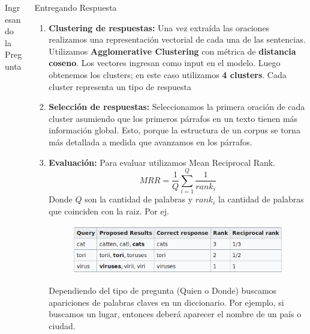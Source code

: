 \documentclass[final]{beamer}
\newlength{\onecolwid}
\newlength{\twocolwid}
\begin{document}
\begin{frame}[t]
\begin{columns}[t]
\begin{column}{\twocolwid}
\begin{columns}[t,totalwidth=\twocolwid]
\begin{column}{\onecolwid}
\begin{block}{Ingresando la Pregunta}
\end{block}


\end{column} %

\begin{column}{\onecolwid}\vspace{-.6in} %


\begin{block}{Entregando Respuesta}
\begin{enumerate}
\item \textbf{Clustering de respuestas:} Una vez extraída las oraciones realizamos una representación vectorial de cada una de las sentencias. Utilizamos \textbf{Agglomerative Clustering} \cite{day1984} con métrica de \textbf{distancia coseno}\cite{smith1997}. Los vectores ingresan como input en el modelo. Luego obtenemos los clusters; en este caso utilizamos \textbf{4 clusters}. Cada cluster representa un tipo de respuesta
\item \textbf{Selección de respuestas:} Seleccionamos la primera oración de cada cluster asumiendo que los primeros párrafos en un texto tienen más información global. Esto, porque la estructura de un corpus se torna más detallada a medida que avanzamos en los párrafos.
\item \textbf{Evaluación:} Para evaluar utilizamos Mean Reciprocal Rank. \begin{equation}
MRR = \frac{1}{Q}\sum_{i=1}^Q\frac{1}{rank_i}
\end{equation}
Donde $Q$ son la cantidad de palabras y $rank_i$ la cantidad de palabras que coinciden con la raiz. Por ej.
\begin{figure}
\centering
\includegraphics[scale=1]{img/tabla.png} 
\end{figure}
Dependiendo del tipo de pregunta (Quien o Donde) buscamos apariciones de palabras claves en un diccionario. Por ejemplo, si buscamos un lugar, entonces deberá aparecer el nombre de un país o ciudad.
\end{enumerate}


\end{block}
\end{column}
\end{columns}
\end{column}
\end{columns}
\end{frame}
\end{document}
